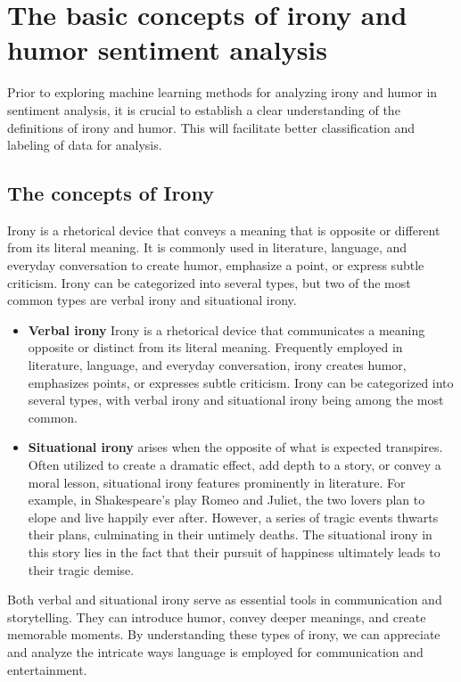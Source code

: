 \documentclass[a4paper]{article}
\begin{document}
\section{The basic concepts of irony and humor sentiment analysis}

Prior to exploring machine learning methods for analyzing irony and humor in sentiment analysis, it is crucial to establish a clear understanding of the definitions of irony and humor. This will facilitate better classification and labeling of data for analysis.

\subsection{The concepts of Irony}

Irony is a rhetorical device that conveys a meaning that is opposite or different from its literal meaning. It is commonly used in literature, language, and everyday conversation to create humor, emphasize a point, or express subtle criticism. Irony can be categorized into several types, but two of the most common types are verbal irony and situational irony.

\begin{itemize}
    \item {\bf Verbal irony} Irony is a rhetorical device that communicates a meaning opposite or distinct from its literal meaning. Frequently employed in literature, language, and everyday conversation, irony creates humor, emphasizes points, or expresses subtle criticism. Irony can be categorized into several types, with verbal irony and situational irony being among the most common.
    \item {\bf Situational irony} arises when the opposite of what is expected transpires. Often utilized to create a dramatic effect, add depth to a story, or convey a moral lesson, situational irony features prominently in literature. For example, in Shakespeare's play Romeo and Juliet, the two lovers plan to elope and live happily ever after. However, a series of tragic events thwarts their plans, culminating in their untimely deaths. The situational irony in this story lies in the fact that their pursuit of happiness ultimately leads to their tragic demise. 
\end{itemize}

Both verbal and situational irony serve as essential tools in communication and storytelling. They can introduce humor, convey deeper meanings, and create memorable moments. By understanding these types of irony, we can appreciate and analyze the intricate ways language is employed for communication and entertainment.
\end{document}
